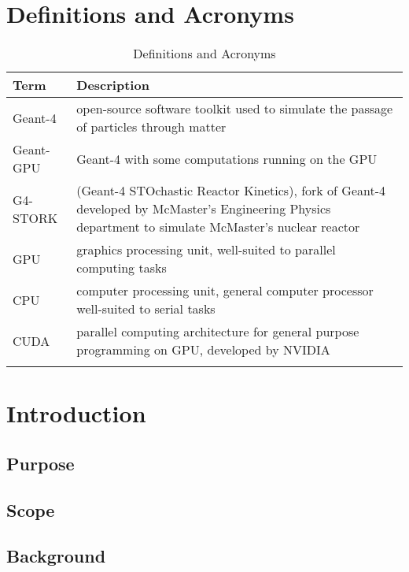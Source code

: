 \documentclass[12pt]{article}
\begin{document}
\section{Definitions and Acronyms} %
\begin{table}[h]
\centering
\caption{Definitions and Acronyms}
\begin{tabularx}{\textwidth}{l|X}
\Xhline{2\arrayrulewidth}
\bf Term & \bf Description\\
\hline
Geant-4 & open-source software toolkit used to simulate the passage of particles through matter\\\hline
Geant-GPU & Geant-4 with some computations running on the GPU\\\hline
G4-STORK & (Geant-4 STOchastic Reactor Kinetics), fork of Geant-4 developed by McMaster's Engineering Physics department to simulate McMaster's nuclear reactor\\\hline
GPU & graphics processing unit, well-suited to parallel computing tasks\\\hline
CPU & computer processing unit, general computer processor well-suited to serial tasks\\\hline
CUDA & parallel computing architecture for general purpose programming on GPU, developed by NVIDIA\\\hline
\Xhline{2\arrayrulewidth}
\end{tabularx}
\end{table}



\section{Introduction} %
\subsection{Purpose} %
\subsection{Scope} %
\subsection{Background} %
\end{document}
